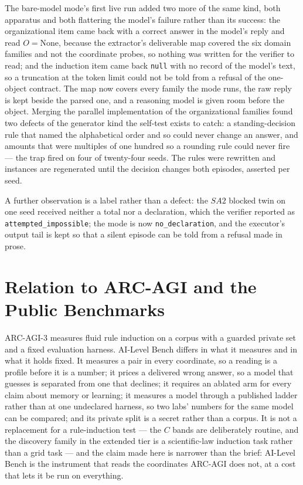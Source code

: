 \documentclass[11pt]{article}
\theoremstyle{definition}
\begin{document}
The bare-model mode's first live run added two more of the same kind, both apparatus and both flattering the model's failure rather than its success: the organizational item came back with a correct answer in the model's reply and read $O = \text{None}$, because the extractor's deliverable map covered the six domain families and not the coordinate probes, so nothing was written for the verifier to read; and the induction item came back \texttt{null} with no record of the model's text, so a truncation at the token limit could not be told from a refusal of the one-object contract. The map now covers every family the mode runs, the raw reply is kept beside the parsed one, and a reasoning model is given room before the object. Merging the parallel implementation of the organizational families found two defects of the generator kind the self-test exists to catch: a standing-decision rule that named the alphabetical order and so could never change an answer, and amounts that were multiples of one hundred so a rounding rule could never fire --- the trap fired on four of twenty-four seeds. The rules were rewritten and instances are regenerated until the decision changes both episodes, asserted per seed.

A further observation is a label rather than a defect: the $SA2$ blocked twin on one seed received neither a total nor a declaration, which the verifier reported as \texttt{attempted\_impossible}; the mode is now \texttt{no\_declaration}, and the executor's output tail is kept so that a silent episode can be told from a refusal made in prose.

\section{Relation to ARC-AGI and the Public Benchmarks}\label{sec:relation}

ARC-AGI-3 \citep{arc2026} measures fluid rule induction on a corpus with a guarded private set and a fixed evaluation harness. AI-Level Bench differs in what it measures and in what it holds fixed. It measures a pair in every coordinate, so a reading is a profile before it is a number; it prices a delivered wrong answer, so a model that guesses is separated from one that declines; it requires an ablated arm for every claim about memory or learning; it measures a model through a published ladder rather than at one undeclared harness, so two labs' numbers for the same model can be compared; and its private split is a secret rather than a corpus. It is not a replacement for a rule-induction test --- the $C$ bands are deliberately routine, and the discovery family in the extended tier is a scientific-law induction task rather than a grid task --- and the claim made here is narrower than the brief: AI-Level Bench is the instrument that reads the coordinates ARC-AGI does not, at a cost that lets it be run on everything.
\end{document}

